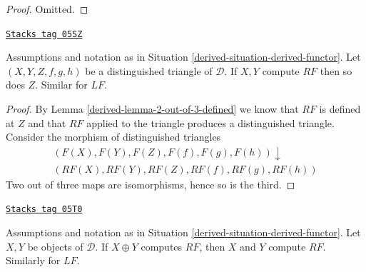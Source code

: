 \begin{proof}
Omitted.
\end{proof}

\begin{lemma}
\label{derived-lemma-2-out-of-3-computes}
\href{https://stacks.math.columbia.edu/tag/05SZ}{\texttt{Stacks tag 05SZ}}

Assumptions and notation as in
Situation \ref{derived-situation-derived-functor}.
Let $(X, Y, Z, f, g, h)$ be a distinguished triangle of $\mathcal{D}$.
If $X, Y$ compute $RF$ then so does $Z$. Similar for $LF$.
\end{lemma}

\begin{proof}

By
Lemma \ref{derived-lemma-2-out-of-3-defined}
we know that $RF$ is defined at $Z$ and that $RF$ applied to the
triangle produces a distinguished triangle.
Consider the morphism of distinguished triangles
$$
\begin{array}{c}(F(X), F(Y), F(Z), F(f), F(g), F(h)) \downarrow \\ (RF(X), RF(Y), RF(Z), RF(f), RF(g), RF(h))\end{array}
$$
Two out of three maps are isomorphisms, hence so is the third.
\end{proof}

\begin{lemma}
\label{derived-lemma-direct-sum-computes}
\href{https://stacks.math.columbia.edu/tag/05T0}{\texttt{Stacks tag 05T0}}

Assumptions and notation as in Situation \ref{derived-situation-derived-functor}.
Let $X, Y$ be objects of $\mathcal{D}$. If $X \oplus Y$ computes $RF$, then
$X$ and $Y$ compute $RF$. Similarly for $LF$.
\end{lemma}

